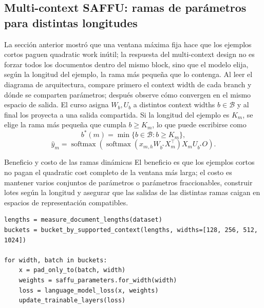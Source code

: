 \subsection{Multi-context SAFFU: ramas de parámetros para distintas longitudes}

La sección anterior mostró que una ventana máxima fija hace que los ejemplos cortos paguen quadratic work inútil; la respuesta del multi-context design no es forzar todos los documentos dentro del mismo block, sino que el modelo elija, según la longitud del ejemplo, la rama más pequeña que lo contenga. Al leer el diagrama de arquitectura, compare primero el context width de cada branch y dónde se comparten parámetros; después observe cómo convergen en el mismo espacio de salida. El curso asigna $W_b,U_b$ a distintos context widths $b\in\mathcal B$ y al final los proyecta a una salida compartida. Si la longitud del ejemplo es $K_m$, se elige la rama más pequeña que cumpla $b\ge K_m$, lo que puede escribirse como
\[
b^*(m)=\min\{b\in\mathcal B:b\ge K_m\},
\]
\[
\hat y_m=\operatorname{softmax}\!\left(
\operatorname{softmax}(x_{m,h}W_{b^*}X_m^\top)X_mU_{b^*}O
\right).
\]


\begin{importantbox}{Beneficio y costo de las ramas dinámicas}
El beneficio es que los ejemplos cortos no pagan el quadratic cost completo de la ventana más larga; el costo es mantener varios conjuntos de parámetros o parámetros fraccionables, construir lotes según la longitud y asegurar que las salidas de las distintas ramas caigan en espacios de representación compatibles.
\end{importantbox}

\begin{lstlisting}[caption={Pseudocódigo de agrupación en lotes según la longitud con dynamic context}]
lengths = measure_document_lengths(dataset)
buckets = bucket_by_supported_context(lengths, widths=[128, 256, 512, 1024])

for width, batch in buckets:
    x = pad_only_to(batch, width)
    weights = saffu_parameters.for_width(width)
    loss = language_model_loss(x, weights)
    update_trainable_layers(loss)
\end{lstlisting}


